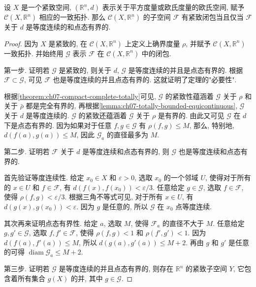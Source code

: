 \documentclass[../../main.tex]{subfiles}
\begin{document}
\begin{theorem}\label{theorem:ch07-ascoli-classical}
设 $X$ 是一个紧致空间, $(\mathbb{R}^n,d)$ 表示关于平方度量或欧氏度量的欧氏空间, 赋予 $\mathcal{C}(X,\mathbb{R}^n)$ 相应的一致拓扑. 那么 $\mathcal{C}(X,\mathbb{R}^n)$ 的子空间 $\mathcal{F}$ 有紧致闭包当且仅当 $\mathcal{F}$ 关于 $d$ 是等度连续的和点态有界的.
\end{theorem}

\begin{proof}
因为 $X$ 是紧致的, 在 $\mathcal{C}(X,\mathbb{R}^n)$ 上定义上确界度量 $\rho$, 并赋予 $\mathcal{C}(X,\mathbb{R}^n)$ 一致拓扑. 并始终用 $\mathcal{G}$ 表示 $\mathcal{F}$ 在 $\mathcal{C}(X,\mathbb{R}^n)$ 中的闭包.

第一步. 证明若 $\mathcal{G}$ 是紧致的, 则关于 $d$, $\mathcal{G}$ 是等度连续的并且是点态有界的. 根据 $\mathcal{F}\subset\mathcal{G}$, 可见 $\mathcal{F}$ 也是等度连续的并且点态有界的. 这就证明了定理的"必要性".

根据\cref{theorem:ch07-compact-complete-totally}可见, $\mathcal{G}$ 的紧致性蕴涵着 $\mathcal{G}$ 关于 $\rho$ 和关于 $\bar{\rho}$ 都是完全有界的, 再根据\cref{lemma:ch07-totally-bounded-equicontinuous}, $\mathcal{G}$ 关于 $d$ 是等度连续的. $\mathcal{G}$ 的紧致还蕴涵着 $\mathcal{G}$ 关于 $\rho$ 是有界的. 由此又可见 $\mathcal{G}$ 在 $d$ 下是点态有界的. 因为如果对于任意 $f,g\in\mathcal{G}$ 有 $\rho(f,g)\leqslant M$, 那么, 特别地, $d(f(a),g(a))\leqslant M$, 因此 $\mathcal{G}_a$ 的直径最多为 $M$.

第二步. 证明若 $\mathcal{F}$ 关于 $d$ 是等度连续和点态有界的, 则 $\mathcal{G}$ 也是等度连续和点态有界的.

首先验证等度连续性. 给定 $x_0\in X$ 和 $\varepsilon>0$, 选取 $x_0$ 的一个邻域 $U$, 使得对于所有的 $x\in U$ 和 $f\in\mathcal{F}$, 有 $d(f(x),f(x_0))<\varepsilon/3$. 任意给定 $g\in\mathcal{G}$, 选取 $f\in\mathcal{F}$, 使得 $\rho(f,g)<\varepsilon/3$. 根据三角不等式可见, 对于所有 $x\in U$, 有 $d(g(x),g(x_0))<\varepsilon$. 因为 $g$ 是任意的, 所以 $\mathcal{G}$ 在 $x_0$ 点等度连续.

其次再来证明点态有界性. 给定 $a$, 选取 $M$, 使得 $\mathcal{F}_a$ 的直径不大于 $M$. 任意给定 $g,g'\in\mathcal{G}$, 选取 $f,f'\in\mathcal{F}$, 使得 $\rho(f,g)<1$ 和 $\rho(f',g')<1$. 因为 $d(f(a),f'(a))\leqslant M$, 所以 $d(g(a),g'(a))\leqslant M+2$. 再由 $g$ 和 $g'$ 是任意的可得 $\operatorname{diam}\mathcal{G}_a\leqslant M+2$.

第三步. 证明若 $\mathcal{G}$ 是等度连续的并且点态有界的, 则存在 $\mathbb{R}^n$ 的紧致子空间 $Y$, 它包含着所有集合 $g(X)$ 的并, 其中 $g\in\mathcal{G}$.


\end{proof}
\end{document}

